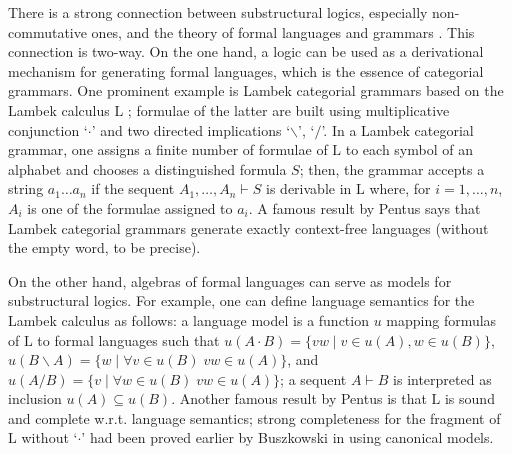 \documentclass[a4paper,UKenglish,cleveref, autoref, thm-restate,pdfa]{lipics-v2021}
\begin{document}
There is a strong connection between substructural logics, especially non-commutative ones, and the theory of formal languages and grammars \cite{Buszkowski03, MootR12}. This connection is two-way. On the one hand, a logic can be used as a derivational mechanism for generating formal languages, which is the essence of categorial grammars. One prominent example is Lambek categorial grammars based on the Lambek calculus $\mathrm{L}$ \cite{Lambek58}; formulae of the latter are built using multiplicative conjunction `$\cdot$' and two directed implications `$\backslash$', `$/$'. In a Lambek categorial grammar, one assigns a finite number of formulae of $\mathrm{L}$ to each symbol of an alphabet and chooses a distinguished formula $S$; then, the grammar accepts a string $a_1\ldots a_n$ if the sequent $A_1,\ldots,A_n \vdash S$ is derivable in $\mathrm{L}$ where, for $i=1,\ldots,n$, $A_i$ is one of the formulae assigned to $a_i$. A famous result by Pentus \cite{Pentus93} says that Lambek categorial grammars generate exactly context-free languages (without the empty word, to be precise).

On the other hand, algebras of formal languages can serve as models for substructural logics. For example, one can define language semantics for the Lambek calculus as follows: a language model is a function $u$ mapping formulas of $\mathrm{L}$ to formal languages such that $u(A \cdot B) = \{vw \mid v \in u(A), w \in u(B)\}$, $u(B \backslash A) = \{w \mid \forall v \in u(B)\; vw \in u(A)\}$, and $u(A/B) = \{v \mid \forall w \in u(B)\; vw \in u(A)\}$; a sequent $A \vdash B$ is interpreted as inclusion $u(A) \subseteq u(B)$. Another famous result by Pentus \cite{Pentus95} is that $\mathrm{L}$ is sound and complete w.r.t. language semantics; strong completeness for the fragment of $\mathrm{L}$ without `$\cdot$' had been proved earlier by Buszkowski in \cite{Buszkowski82} using canonical models.
\end{document}
